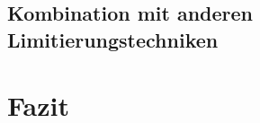         \subsection{Kombination mit anderen Limitierungstechniken}
    \section{Fazit}

    \newpage
    
    

    \listoffigures


